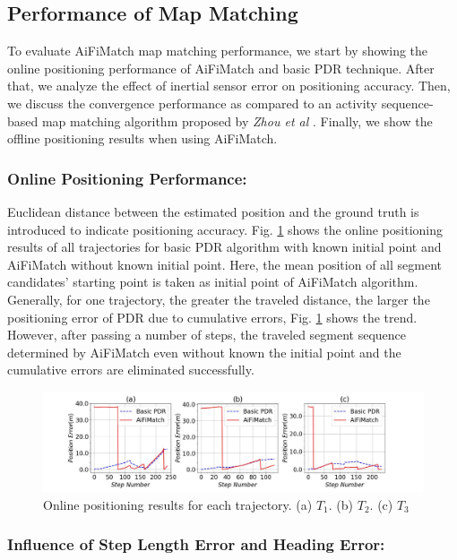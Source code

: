 \documentclass{llncs}
\begin{document}
\subsection{Performance of Map Matching}

To evaluate AiFiMatch map matching performance, we start by showing the online positioning performance of AiFiMatch and basic PDR technique. After that, we analyze the effect of inertial sensor error on positioning accuracy. Then, we discuss the convergence performance as compared to an activity sequence-based map matching algorithm proposed by \emph{Zhou et al} \cite{zhou2015activity}. Finally, we show the offline positioning results when using AiFiMatch.

\subsubsection{Online Positioning Performance:}

Euclidean distance between the estimated position and the ground truth is introduced to indicate positioning accuracy.  Fig. \ref{fig-online} shows the online positioning results of all trajectories for basic PDR algorithm with known initial point and AiFiMatch without known initial point.  Here, the mean position of all segment candidates' starting point is taken as initial point of AiFiMatch algorithm. Generally, for one trajectory, the greater the traveled distance, the larger the positioning error of PDR due to cumulative errors, Fig. \ref{fig-online} shows the trend.  However, after passing a number of steps, the traveled segment sequence determined by AiFiMatch even without known the initial point and the cumulative  errors are eliminated successfully.

\begin{figure}[!htbp]
	\centering
	\includegraphics[width=4.8in]{AiFiMatch-OnlinePosition}
	\caption{Online positioning results for each trajectory. (a) $T_1$. (b) $T_2$. (c) $T_3$}
	\label{fig-online}
\end{figure}


\subsubsection{Influence of Step Length Error and Heading Error: }
\end{document}

